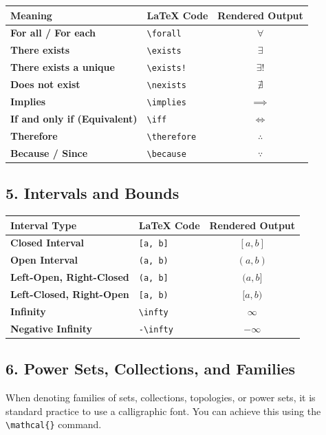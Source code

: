 \documentclass[11pt]{article}
\begin{document}
\begin{table}[H]
\centering
\begin{tabular}{llc}
\toprule
\textbf{Meaning} & \textbf{\LaTeX{} Code} & \textbf{Rendered Output} \\
\midrule
\textbf{For all / For each} & \verb|\forall| & $\forall$ \\
\textbf{There exists} & \verb|\exists| & $\exists$ \\
\textbf{There exists a unique} & \verb|\exists!| & $\exists!$ \\
\textbf{Does not exist} & \verb|\nexists| & $\nexists$ \\
\textbf{Implies} & \verb|\implies| & $\implies$ \\
\textbf{If and only if (Equivalent)} & \verb|\iff| & $\iff$ \\
\textbf{Therefore} & \verb|\therefore| & $\therefore$ \\
\textbf{Because / Since} & \verb|\because| & $\because$ \\
\bottomrule
\end{tabular}
\end{table}

\subsection*{5. Intervals and Bounds}

\begin{table}[H]
\centering
\begin{tabular}{llc}
\toprule
\textbf{Interval Type} & \textbf{\LaTeX{} Code} & \textbf{Rendered Output} \\
\midrule
\textbf{Closed Interval} & \verb|[a, b]| & $[a, b]$ \\
\textbf{Open Interval} & \verb|(a, b)| & $(a, b)$ \\
\textbf{Left-Open, Right-Closed} & \verb|(a, b]| & $(a, b]$ \\
\textbf{Left-Closed, Right-Open} & \verb|[a, b)| & $[a, b)$ \\
\textbf{Infinity} & \verb|\infty| & $\infty$ \\
\textbf{Negative Infinity} & \verb|-\infty| & $-\infty$ \\
\bottomrule
\end{tabular}
\end{table}

\subsection*{6. Power Sets, Collections, and Families}
When denoting families of sets, collections, topologies, or power sets, it is standard practice to use a calligraphic font. You can achieve this using the \verb|\mathcal{}| command.
\end{document}
